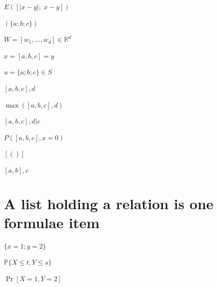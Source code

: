 \documentclass{article}
\begin{document}
$E\!\left([|x-y|;\;x-y]\right)$

$\left(\{a;b;c\}\right)$

$W=[w_1,\ldots,w_d]\in\mathbb{R}^{d}$

$x=[a,b,c]=y$

$u=\{a;b;c\}\in S$

$[a,b,c],d$

$\max([a,b,c],d)$

$[a,b,c],d|e$

$P([a,b,c],x=0)$

$[()]$

$[a,b],c$

\section{A list holding a relation is one formulae item}
$\{x=1;y=2\}$

$\mathbb{P}\{X\le t,Y\le s\}$

$\Pr[X=1,Y=2]$
\end{document}
